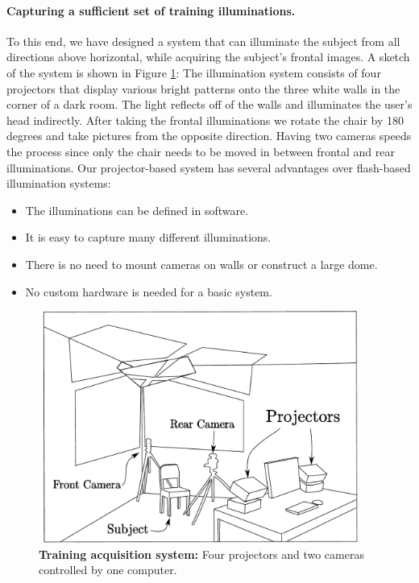\paragraph{Capturing a sufficient set of training illuminations.}   To this end, we have designed a system that can illuminate the subject from all directions above horizontal, while acquiring the subject's frontal images. A sketch of the system is shown in Figure \ref{fig:system}: The illumination system consists of four projectors that display various bright patterns onto the three white walls in the corner of a dark room.  The light reflects off of the walls and illuminates the user's head indirectly.  After taking the frontal illuminations we rotate the chair by 180 degrees and take pictures from the opposite direction.  Having two cameras speeds the process since only the chair needs to be moved in between frontal and rear illuminations.  
Our projector-based system has several advantages over flash-based illumination systems:\vspace{0mm}
\begin{itemize}
\item The illuminations can be defined in software.\vspace{0mm}
\item It is easy to capture many different illuminations.\vspace{0mm}
\item There is no need to mount cameras on walls or construct a large dome.\vspace{0mm}
\item No custom hardware is needed for a basic system.\vspace{0mm}
\end{itemize}
\begin{figure}
\centerline{\hspace{-0.1in}\includegraphics[height=3in]{figures_cvpr/camera_rig.pdf}}
\caption{{\bf Training acquisition system:} Four projectors and two cameras controlled by one computer.\vspace{0mm}}
\label{fig:system}
\end{figure}

